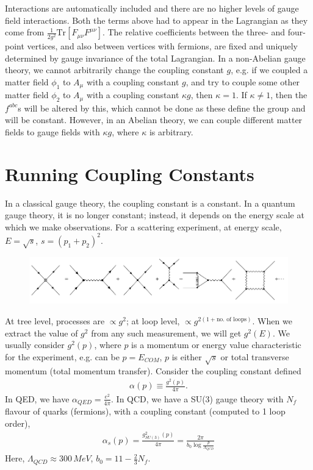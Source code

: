 \documentclass[relqm.tex]{subfiles}
\begin{document}
Interactions are automatically included and there are no higher levels of gauge field interactions. 
Both the terms above had to appear in the Lagrangian as they come from $\frac{1}{2g^2}\text{Tr}[F_{\mu\nu}F^{\mu\nu}]$.
The relative coefficients between the three- and four-point vertices, and also between vertices with fermions, are fixed and uniquely determined by gauge invariance of the total Lagrangian. 
In a non-Abelian gauge theory, we cannot arbitrarily change the coupling constant $g$, e.g. if we coupled a matter field $\phi_1$ to $A_\mu$ with a coupling constant $g$, and try to couple some other matter field $\phi_2$ to $A_\mu$ with a coupling constant $\kappa g$, then $\kappa=1$.
If $\kappa\neq1$, then the $f^{abc}$s will be altered by this, which cannot be done as these define the group and will be constant. 
However, in an Abelian theory, we can couple different matter fields to gauge fields with $\kappa g$, where $\kappa$ is arbitrary. 

\section{Running Coupling Constants}
In a classical gauge theory, the coupling constant is a constant.
In a quantum gauge theory, it is no longer constant; instead, it depends on the energy scale at which we make observations. 
For a scattering experiment, at energy scale, $E = \sqrt{s}$, $s=(p_1+p_2)^2$.
\begin{figure}[H]
    \centering
    \includegraphics[scale=0.5]{diagrams/loopsum.png}
\end{figure}
At tree level, processes are $\propto g^2$; at loop level, $\propto g^{2(1+\text{no. of loops})}$.
When we extract the value of $g^2$ from any such measurement, we will get $g^2(E)$.
We usually consider $g^2(p)$, where $p$ is a momentum or energy value characteristic for the experiment, e.g. can be $p=E_{COM}$, $p$ is either $\sqrt{s}$ or total transverse momentum (total momentum transfer).
Consider the coupling constant defined
\begin{align}
    \alpha(p) \equiv \frac{g^2(p)}{4\pi}.
\end{align}
In QED, we have $\alpha_{QED}=\frac{e^2}{4\pi}$.
In QCD, we have a SU(3) gauge theory with $N_f$ flavour of quarks (fermions), with a coupling constant (computed to 1 loop order),
\begin{align}
    \alpha_s(p) = \frac{g^2_{SU(3)}(p)}{4\pi} = \frac{2\pi}{b_0\log\frac{p}{\Lambda_{QCD}}}
\end{align}
Here, $\Lambda_{QCD}\approx300\,MeV$, $b_0=11-\frac23 N_f$. 
\end{document}
